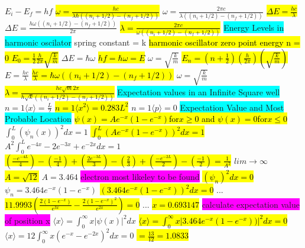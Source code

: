 \documentclass[6pt, oneside]{article}   	%
\begin{document}
$E_i - E_f = hf$
\hl{$\omega = \frac{hc}{\lambda \hbar ((n_i + 1/2)-(n_f + 1/2))}$}
$\omega = \frac{2\pi c}{\lambda ((n_i + 1/2)-(n_f + 1/2))}$
\hl{$\Delta E = \frac{hc}{\lambda}$}
$\Delta E = \frac{h\omega ((n_i + 1/2)-(n_f + 1/2))}{2\pi}$
\hl{$\lambda = \frac{2\pi c}{\omega ((n_i + 1/2)-(n_f + 1/2)) }$}
\colorbox{Cyan}{Energy Levels in harmonic oscilator}
spring constant = k
\hl{harmonic oscillator zero point energy n = 0 $E_0 = \frac{1}{2} \frac{h}{2\pi} \sqrt{\frac{k}{m}}$}
$\Delta E = \hbar \omega $
\hl{$hf = \hbar \omega = E$}
$\omega = \sqrt{\frac{k}{m}}$
\hl{$E_n = (n+\frac{1}{2})(\frac{h}{2\pi})(\sqrt{\frac{k}{m}})$}
$E = \frac{hc}{\lambda}$
\hl{$\frac{hc}{\lambda} = \hbar \omega((n_i + 1/2)-(n_f + 1/2))$}
$\omega = \sqrt{\frac{k}{m}}$
\hl{$\lambda = \frac{hc\sqrt{m}2\pi}{h\sqrt{k}((n_i + 1/2)-(n_f + 1/2))}$}
\colorbox{Cyan}{Expectation values in an Infinite Square well}
$n = 1 \langle x \rangle = \frac{L}{2}$
\hl{$n = 1 \langle x^2 \rangle = 0.283 L^2$}
$n = 1 \langle p \rangle = 0$
\colorbox{Cyan}{Expectation Value and Most Probable Location}
\hl{$\psi(x) = Ae^{-x}(1-e^{-x})$for$x\geq0$ and $\psi(x) = 0 $for$x\leq0$}
$\int_0^L (\psi_n(x))^2 dx = 1$
\hl{$\int_0^L (Ae^{-x}(1-e^{-x}))^2 dx = 1$}
$ A^2 \int_0^L e^{-4x} - 2e^{-3x} + e^{-2x} dx = 1$
\hl{$ (\frac{-e^{-4L}}{4})-(\frac{-1}{4}) + (\frac{2e^{-3L}}{3})-(\frac{2}{3}) + (\frac{-e^{-2L}}{2})-(\frac{-1}{2}) = \frac{1}{A^2}$}
$lim \rightarrow \infty$
\hl{$A = \sqrt{12}$}
$A = 3.464$
\colorbox{Fuchsia}{electron most likeley to be found}
\hl{$(\psi_n)^2 dx = 0$}
$\psi_n = 3.464 e^{-x}(1-e^{-x})$
\hl{$(3.464 e^{-x}(1-e^{-x}))^2 dx = 0$}
...
\hl{$11.9993(\frac{2(1-e^{-x})}{e^{3x}} - \frac{2(1-e^{-x})^2}{e^{2x}})  = 0$}
...
\hl{$x = 0.693147$}
\colorbox{Fuchsia}{calculate expectation value of position x}
$\langle x \rangle = \int_0^{\infty} x|\psi(x)|^2 dx$
\hl{$\langle x \rangle = \int_0^{\infty} x| 3.464 e^{-x} (1-e^{-x})) |^2 dx = 0$}
$\langle x \rangle = 12 \int_0^{\infty} x (e^{-x} - e^{-2x})^2 dx = 0$
\hl{$=\frac{13}{12} = 1.0833$}
\end{document}
